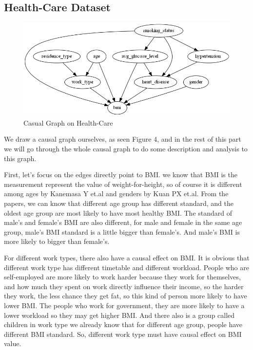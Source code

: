 \documentclass[letterpaper,12pt]{article}
\begin{document}
\subsection{Health-Care Dataset}
\begin{figure}[htb]
\centering
\includegraphics[scale=0.5]{casual_health.png}
\caption{Casual Graph on Health-Care}
\label{fig:pathdemo}
\end{figure}

We draw a causal graph ourselves, as seen Figure 4, and in the rest of this part we will go through the whole causal graph to do some description and analysis to this graph.\par

First, let’s focus on the edges directly point to BMI. we know that BMI is the measurement represent the value of weight-for-height, so of course it is different among ages by Kanemasa Y et.al\cite{kanemasa2018analysis} and genders by Kuan PX et.al\cite{kuan2011gender}. From the papers, we can know that different age group has different standard, and the oldest age group are most likely to have most healthy BMI. The standard of male’s and female’s BMI are also different, for male and female in the same age group, male’s BMI standard is a little bigger than female’s. And male’s BMI is more likely to bigger than female’s. \par

For different work types, there also have a causal effect on BMI. It is obvious that different work type has different timetable and different workload. People who are self-employed are more likely to work harder because they work for themselves, and how much they spent on work directly influence their income, so the harder they work, the less chance they get fat, so this kind of person more likely to have lower BMI. The people who work for government, they are more likely to have a lower workload so they may get higher BMI. And there also is a group called children in work type we already know that for different age group, people have different BMI standard. So, different work type must have causal effect on BMI value.
\end{document}
